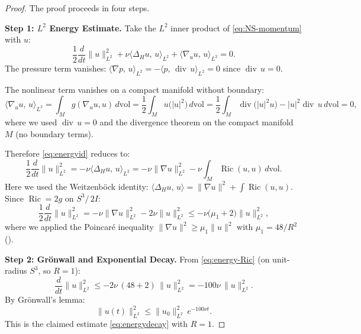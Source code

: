\documentclass[11pt,a4paper]{article}
\theoremstyle{plain}
\theoremstyle{definition}
\DeclareMathOperator{\Ric}{Ric}
\DeclareMathOperator{\dv}{div}
\newcommand{\Lap}{\Delta}                 %
\newcommand{\DS}{S^3\!/\,2I}             %
\newcommand{\norm}[1]{\lVert #1 \rVert}
\newcommand{\ip}[2]{\langle #1,\, #2 \rangle}
\newcommand{\abs}[1]{\lvert #1 \rvert}
\begin{document}
\begin{proof}
The proof proceeds in four steps.

\medskip
\noindent\textbf{Step 1: $L^2$ Energy Estimate.}
Take the $L^2$ inner product of \eqref{eq:NS-momentum} with $u$:
\begin{equation}\label{eq:energyid}
  \frac{1}{2}\frac{d}{dt}\norm{u}_{L^2}^2
  + \nu \ip{\Lap_H u}{u}_{L^2}
  + \ip{\nabla_u u}{u}_{L^2}
  = 0.
\end{equation}
The pressure term vanishes: $\ip{\nabla p}{u}_{L^2} = -\ip{p}{\dv\, u}_{L^2}
= 0$ since $\dv\, u = 0$.

The nonlinear term vanishes on a compact manifold without boundary:
\begin{equation}\label{eq:nonlinear-vanish}
  \ip{\nabla_u u}{u}_{L^2}
  = \int_M g(\nabla_u u, u)\, d\mathrm{vol}
  = \frac{1}{2}\int_M u\bigl(\abs{u}^2\bigr)\, d\mathrm{vol}
  = \frac{1}{2}\int_M \dv\bigl(\abs{u}^2 u\bigr) - \abs{u}^2 \dv\, u
    \, d\mathrm{vol}
  = 0,
\end{equation}
where we used $\dv\, u = 0$ and the divergence theorem on the compact
manifold $M$ (no boundary terms).

Therefore \eqref{eq:energyid} reduces to:
\begin{equation}\label{eq:energy-reduced}
  \frac{1}{2}\frac{d}{dt}\norm{u}_{L^2}^2
  = -\nu \ip{\Lap_H u}{u}_{L^2}
  = -\nu \norm{\nabla u}_{L^2}^2 - \nu \int_M \Ric(u,u)\, d\mathrm{vol}.
\end{equation}
Here we used the Weitzenb\"{o}ck identity: $\ip{\Lap_H u}{u} = \norm{\nabla
u}^2 + \int \Ric(u,u)$.  Since $\Ric = 2g$ on $\DS$:
\begin{equation}\label{eq:energy-Ric}
  \frac{1}{2}\frac{d}{dt}\norm{u}_{L^2}^2
  = -\nu \norm{\nabla u}_{L^2}^2 - 2\nu \norm{u}_{L^2}^2
  \le -\nu\bigl(\mu_1 + 2\bigr) \norm{u}_{L^2}^2,
\end{equation}
where we applied the Poincar\'{e} inequality $\norm{\nabla u}^2 \ge
\mu_1 \norm{u}^2$ with $\mu_1 = 48/R^2$ ().

\medskip
\noindent\textbf{Step 2: Gr\"{o}nwall and Exponential Decay.}
From \eqref{eq:energy-Ric} (on unit-radius $S^3$, so $R=1$):
\[
  \frac{d}{dt}\norm{u}_{L^2}^2
  \le -2\nu\, (48 + 2)\, \norm{u}_{L^2}^2
  = -100\nu\, \norm{u}_{L^2}^2.
\]
By Gr\"{o}nwall's lemma:
\begin{equation}\label{eq:gronwall}
  \norm{u(t)}_{L^2}^2 \le \norm{u_0}_{L^2}^2\, e^{-100\nu t}.
\end{equation}
This is the claimed estimate \eqref{eq:energydecay} with $R = 1$.


\end{proof}
\end{document}
